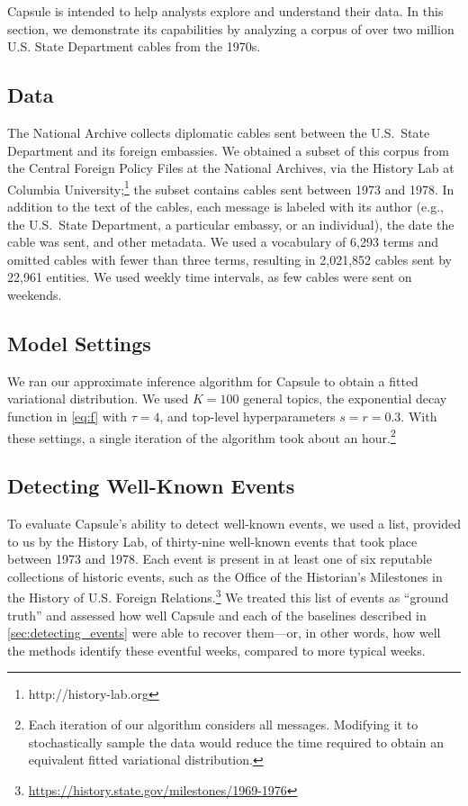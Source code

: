 Capsule is intended to help analysts explore and understand their
data. In this section, we demonstrate its capabilities by analyzing a
corpus of over two million U.S. State Department cables from the
1970s.

\subsection{Data}

The National Archive collects diplomatic cables sent between the
U.S.~State Department and its foreign embassies. We obtained a subset
of this corpus from the Central Foreign Policy Files at the National
Archives, via the History Lab at Columbia
University;\footnote{http://history-lab.org} the subset contains
cables sent between 1973 and 1978. In addition to the text
of the cables, each message is labeled with its author (e.g., the
U.S.~State Department, a particular embassy, or an individual),
the date the cable was sent, and other metadata. We
used a vocabulary of 6,293 terms and omitted cables with fewer than
three terms, resulting in 2,021,852 cables sent by 22,961
entities. We used weekly time intervals, as few cables were sent on
weekends.

\subsection{Model Settings}

We ran our approximate inference algorithm for Capsule to obtain a
fitted variational distribution. We used $K=100$ general topics, the
exponential decay function in \cref{eq:f} with $\tau=4$, and top-level
hyperparameters $s=r=0.3$. With these settings, a single iteration of
the algorithm took about an hour.\footnote{Each iteration of our
  algorithm considers all messages. Modifying it to stochastically
  sample the data would reduce the time required to obtain an
  equivalent fitted variational distribution.}

\subsection{Detecting Well-Known Events}

To evaluate Capsule's ability to detect well-known events, we used a
list, provided to us by the History Lab, of thirty-nine well-known
events that took place between 1973 and 1978. Each event is present in
at least one of six reputable collections of historic events, such as
the Office of the Historian's Milestones in the History of
U.S. Foreign
Relations.\footnote{\url{https://history.state.gov/milestones/1969-1976}}
We treated this list of events as ``ground truth'' and assessed how
well Capsule and each of the baselines described in
\cref{sec:detecting_events} were able to recover them---or, in other words,
how well the methods identify these eventful weeks, compared to more typical weeks.

